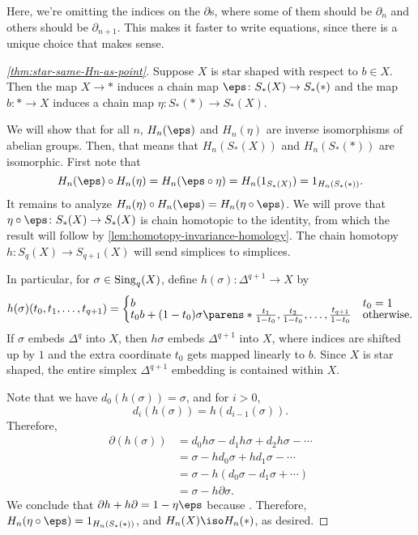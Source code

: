 \documentclass{standalone}
\begin{document}
Here, we're omitting the indices on the \(\partial\)s, where some of them
should be \(\partial_n\) and others should be \(\partial_{n+1}\).
This makes it faster to write equations, since there is a unique choice
that makes sense.

\begin{proof}[\cref{thm:star-same-Hn-as-point}]
  Suppose \(X\) is star shaped with respect to \(b \in X\). Then the map
  \(X \to *\) induces a chain map \(\eps \colon S_*(X) \to S_*(*)\)
  and the map \(b \colon * \to X\) induces a chain map
  \(\eta \colon S_*(*) \to S_*(X)\).

  We will show that for all \(n\), \(H_n(\eps)\) and \(H_n(\eta)\) are
  inverse isomorphisms of abelian groups. Then, that means that \(H_n(S_*(X))\)
  and \(H_n(S_*(*))\) are isomorphic. First note that
  \[
    H_n(\eps) \circ H_n(\eta) = H_n(\eps \circ \eta)
      = H_n(1_{S_*(X)})
      = 1_{H_n(S_*(*))}.
  \]
  It remains to analyze \(H_n(\eta) \circ H_n(\eps) = H_n(\eta \circ \eps)\).
  We will prove that \(\eta \circ \eps \colon S_*(X) \to S_*(X)\)
  is chain homotopic to the identity, from which the result will follow by
  \cref{lem:homotopy-invariance-homology}.
  The chain homotopy \(h \colon S_{q}(X) \to S_{q+1}(X)\) will send
  simplices to simplices.

  In particular, for \(\sigma \in \operatorname{Sing}_q(X)\),
  define \(h(\sigma) \colon \Delta^{q+1} \to X\) by
  \[
    h(\sigma)(t_0, t_1, \dots, t_{q + 1}) = \begin{cases}
      b & t_0 = 1 \\[-1ex]
      t_0 b + (1-t_0) \sigma\parens*{
        \frac{t_1}{1-t_0},
        \frac{t_2}{1-t_0},
        \dots,
        \frac{t_{q+1}}{1-t_0}
      } & \text{otherwise}.
    \end{cases}
  \]
  If \(\sigma\) embeds \(\Delta^q\) into \(X\), then \(h\sigma\) embeds
  \(\Delta^{q+1}\) into \(X\), where indices are shifted up by \(1\)
  and the extra coordinate \(t_0\) gets mapped linearly to \(b\).
  Since \(X\) is star shaped, the entire simplex \(\Delta^{q+1}\) embedding
  is contained within \(X\).

  Note that we have \(d_0(h(\sigma)) = \sigma\), and for \(i > 0\),
  \[
    d_i(h(\sigma)) = h(d_{i-1}(\sigma)).
  \]
  Therefore,
  \begin{align*}
    \partial(h(\sigma))
      &= d_0 h \sigma - d_1 h \sigma + d_2 h \sigma - \cdots \\
      &= \sigma - h d_0 \sigma + h d_1 \sigma - \cdots \\
      &= \sigma - h (d_0 \sigma - d_1 \sigma + \cdots) \\
      &= \sigma - h \partial \sigma.
  \end{align*}
  We conclude that \(\partial h + h \partial = 1 - \eta \eps\) because \TODO{}.
  Therefore, \(H_n(\eta \circ \eps) = 1_{H_n(S_*(*))}\), and
  \(H_n(X) \iso H_n(*)\), as desired.
\end{proof}
\end{document}
